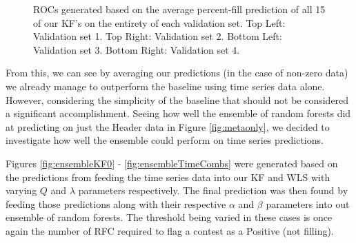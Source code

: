 \begin{figure}[h]
\caption{ROCs generated based on the average percent-fill prediction of all 15 of our KF's on the entirety of each validation set. Top Left: Validation set 1. Top Right: Validation set 2. Bottom Left: Validation set 3. Bottom Right: Validation set 4.}
\label{fig:averageCompn0}
\end{figure}

From this, we can see by averaging our predictions (in the case of non-zero data) we already manage to outperform the baseline using time series data alone. However, considering the simplicity of the baseline that should not be considered a significant accomplishment. Seeing how well the ensemble of random forests did at predicting on just the Header data in Figure \ref{fig:metaonly}, we decided to investigate how well the ensemble could perform on time series predictions.

\pagebreak

Figures \ref{fig:ensembleKF0} - \ref{fig:ensembleTimeCombs} were generated based on the predictions from feeding the time series data into our KF and WLS with varying $Q$ and $\lambda$ parameters respectively. The final prediction was then found by feeding those predictions along with their respective $\alpha$ and $\beta$ parameters into out ensemble of random forests. The threshold being varied in these cases is once again the number of RFC required to flag a contest as a Positive (not filling).

